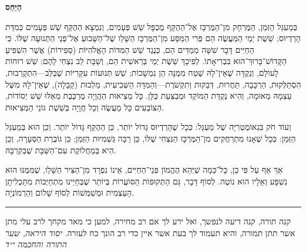 \documentclass[11pt,oneside]{amsbook}
\numberwithin{equation}{section}
\newenvironment{hebrew}{\par\hebrewfont}{\par}
\theoremstyle{plain}
\theoremstyle{definition}
\theoremstyle{remark}
\begin{document}
\ifPDFTeX
\else
  \begin{hebrew}

    \begin{center}
      \textbf{הַיַּחַס}
    \end{center}

    בְּמַעְגַּל הַזְּמַן, הַמֶּרְחָק מִן־הַמֶּרְכָּז אֶל־הַהֶקֵּף מֻכְפָּל שֵׁשׁ פְּעָמִים, וְנִמְצָא הַהֶקֵּף שֵׁשׁ פְּעָמִים כְּמִדַּת הָרַדְיוּס; שֵׁשֶׁת יְמֵי הַמַּעֲשֶׂה הֵם פְּרִי הַמַּסָּע מִן־הַמֶּרְכָּז הַשָּׁלֵו שֶׁל־הַשָּׁבוּעַ אֶל־פְּנֵי הַתְּנוּעָה שֶׁלּוֹ. כִּי הַחַיִּים דָּבָר שִׁשָּׁה מְמַדִּים הֵם, כְּנֶגֶד שֵׁשׁ הַמִּדּוֹת הָאֱלֹהִיּוֹת (סְפִירוֹת) אֲשֶׁר הִשְׁפִּיעַ הַקָּדוֹשׁ־בָּרוּךְ־הוּא בִּבְרִיאָתוֹ. לְפִיכָךְ שֵׁשֶׁת יְמֵי בְּרֵאשִׁית הֵם, וְשַׁבָּת לֵב נִצְחִי לָהֶם; שֵׁשׁ רוּחוֹת לָעוֹלָם, וְנְקֻדָּה שֶׁאֵין־לָהּ שֶׁטַח מִמֶּנָּה הֵן נִמְשָׁכוֹת; שֵׁשׁ תְּנוּעוֹת עִקָּרִיּוֹת שֶׁבַּלֵּב—הִתְקָרְבוּת, הִסְתַּלְּקוּת, הַרְכָּבָה, תַּחֲרוּת, דְּבֵקוּת וְתִקְשֹׁרֶת—וְהַמִּדָּה הַשְּׁבִיעִית, מַלְכוּת (קַבָּלָה), שֶׁאֵין־לָהּ מִשֶּׁל עַצְמָהּ מְאוּמָה, וְהִיא נְקֻדַּת הַמּוֹקֵד וּמְבַצַּעַת כֻּלָּן. כָּל מְצִיאוּת הַהֲוָיָה מֻרְכֶּבֶת מֵאֵלּוּ שֵׁשׁ יְסוֹדוֹת, הַצּוֹבְעִים כָּל מַעֲשֶׂה וְכָל חֲוָיָה בְּשֵׁשֶׁת גּוֹנֵי הַמְּצִיאוּת.

    וְעוֹד חֹק בִּגְאוֹמֶטְרִיָּה שֶׁל מַעְגָּל: כְּכָל שֶׁהָרַדְיוּס גָּדוֹל יוֹתֵר, כֵּן הַהֶקֵּף גָּדוֹל יוֹתֵר. וְכֵן הוּא בְּמַעְגַּל הַזְּמַן: כְּכָל שֶׁאָנוּ מִתְרַחֲקִים מִן־הַמֶּרְכָּז הַנִּצְחִי שֶׁלּוֹ, כֵּן רַבָּה גַּשְׁמִיּוּת הַזְּמַן; כֵּן גּוֹבֶרֶת הַסְּעָרָה, וְכֵן הִיא בְּמַחֲלוֹקֶת עִם־הַשַּׁבָּת שֶׁבְּקִרְבָּהּ.

    אַךְ אַף עַל פִּי כֵן, כָּל־כַּמָּה שֶׁיְּהֵא הֶהֱמוֹן פְּנֵי־הַחַיִּים, אֵינוֹ נִפְרָד מִן־הַצִּיר הַשָּׁלֵו, שֶׁמִּמֶּנּוּ הוּא נִשְׁפָּע וְאֵלָיו הוּא נוֹטֶה. לְסוֹף דָּבָר, גַּם הַתְּקוּפוֹת הַסּוֹעֲרוֹת בְּיוֹתֵר שֶׁבְּחַיֵּינוּ מִתְחַיְּבוֹת מִתַּכְלִיתָן הָעַצְמִית וּמְשַׁמְּשׁוֹת לְסוֹף שָׁלוֹם וְהַרְמוֹנְיָה.

  \end{hebrew}

  \noindent\rule{\textwidth}{0.4pt}\par\medskip

  \begin{hebrew}
    קנה תורה, קנה דיעה לנפשך, ואל ירע לך אם רב מחירה,
    למען כי מאד מקחך לרב עלי מתן אשר תתן תמורה,
    והיא תעמוד לך בעת אשר איין כדי רב הונך כח לעזרה.
    \emph{יסוד היראה, שער התורה והחכמה י״ד}
  \end{hebrew}
\end{document}
